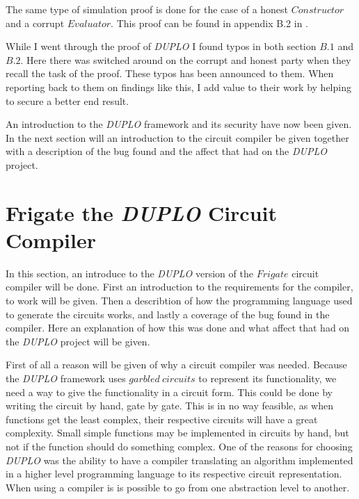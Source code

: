 \documentclass[twoside,11pt,openright]{report}
\newcommand{\DUPLO}{\textit{DUPLO} }
\begin{document}
The same type of simulation proof is done for the case of a honest $Constructor$ and a corrupt $Evaluator$. This proof can be found in appendix B.2 in \cite{duplo}.

\bigskip

While I went through the proof of \DUPLO I found typos in both section $B.1$ and $B.2$. Here there was switched around on the corrupt and honest party when they recall the task of the proof. These typos has been announced to them. When reporting back to them on findings like this, I add value to their work by helping to secure a better end result.

\bigskip

An introduction to the \DUPLO framework and its security have now been given. In the next section will an introduction to the circuit compiler be given together with a description of the bug found and the affect that had on the \DUPLO project.

\section{Frigate the \DUPLO Circuit Compiler}
\label{sec:frigate}
In this section, an introduce to the \DUPLO version of the $Frigate$ circuit compiler will be done. First an introduction to the requirements for the compiler, to work will be given. Then a describtion of how the programming language used to generate the circuits works, and lastly a coverage of the bug found in the compiler. Here an explanation of how this was done and what affect that had on the \DUPLO project will be given.

First of all a reason will be given of why a circuit compiler was needed. Because the \DUPLO framework uses $garbled~circuits$ to represent its functionality, we need a way to give the functionality in a circuit form. This could be done by writing the circuit by hand, gate by gate. This is in no way feasible, as when functions get the least complex, their respective circuits will have a great complexity. Small simple functions may be implemented in circuits by hand, but not if the function should do something complex. One of the reasons for choosing \DUPLO was the ability to have a compiler translating an algorithm implemented in a higher level programming language to its respective circuit representation. When using a compiler is is possible to go from one abstraction level to another.
\end{document}
